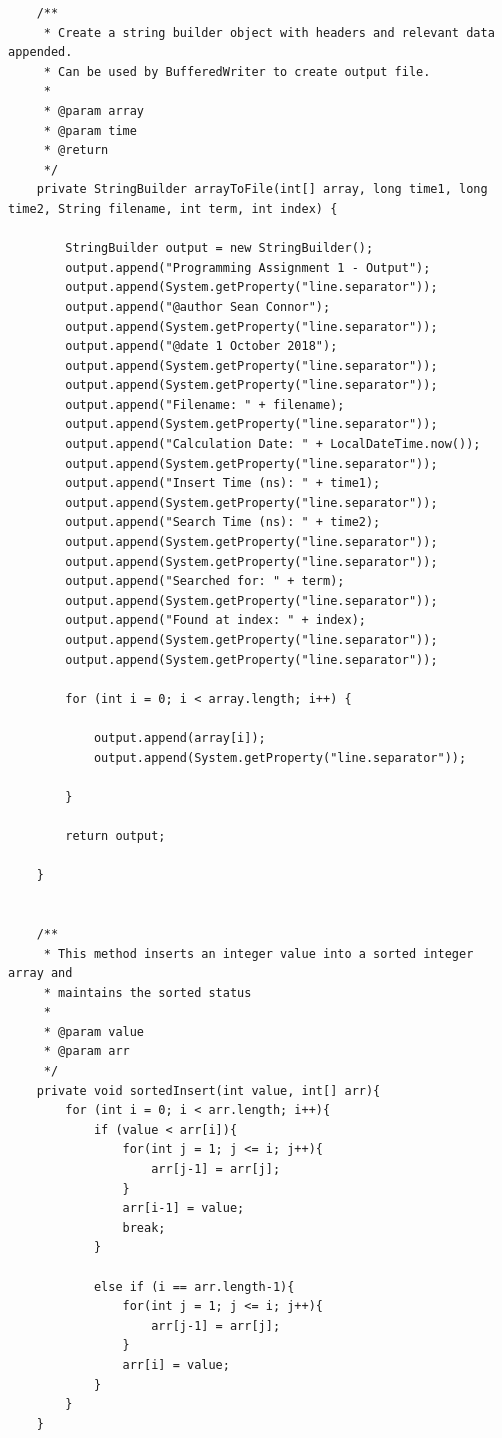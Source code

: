 \documentclass[11pt]{article}
\begin{document}
\begin{lstlisting}
    /**
     * Create a string builder object with headers and relevant data appended.
     * Can be used by BufferedWriter to create output file.
     *
     * @param array
     * @param time
     * @return
     */
    private StringBuilder arrayToFile(int[] array, long time1, long time2, String filename, int term, int index) {

        StringBuilder output = new StringBuilder();
        output.append("Programming Assignment 1 - Output");
        output.append(System.getProperty("line.separator"));
        output.append("@author Sean Connor");
        output.append(System.getProperty("line.separator"));
        output.append("@date 1 October 2018");
        output.append(System.getProperty("line.separator"));
        output.append(System.getProperty("line.separator"));
        output.append("Filename: " + filename);
        output.append(System.getProperty("line.separator"));
        output.append("Calculation Date: " + LocalDateTime.now());
        output.append(System.getProperty("line.separator"));
        output.append("Insert Time (ns): " + time1);
        output.append(System.getProperty("line.separator"));
        output.append("Search Time (ns): " + time2);
        output.append(System.getProperty("line.separator"));
        output.append(System.getProperty("line.separator"));
        output.append("Searched for: " + term);
        output.append(System.getProperty("line.separator"));
        output.append("Found at index: " + index);
        output.append(System.getProperty("line.separator"));
        output.append(System.getProperty("line.separator"));

        for (int i = 0; i < array.length; i++) {

            output.append(array[i]);
            output.append(System.getProperty("line.separator"));

        }

        return output;

    }


    /**
     * This method inserts an integer value into a sorted integer array and
     * maintains the sorted status
     *
     * @param value
     * @param arr
     */
    private void sortedInsert(int value, int[] arr){
        for (int i = 0; i < arr.length; i++){
            if (value < arr[i]){
                for(int j = 1; j <= i; j++){
                    arr[j-1] = arr[j];
                }
                arr[i-1] = value;
                break;
            }

            else if (i == arr.length-1){
                for(int j = 1; j <= i; j++){
                    arr[j-1] = arr[j];
                }
                arr[i] = value;
            }
        }
    }



\end{lstlisting}
\end{document}
